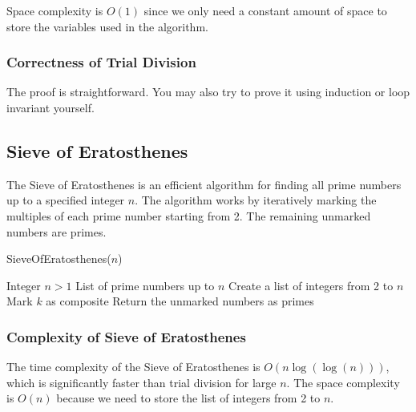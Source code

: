 \documentclass[oneside]{book}
\begin{document}
Space complexity is \(O(1)\) since we only need a constant amount of space to store the variables used in the algorithm.

\subsubsection{Correctness of Trial Division}
The proof is straightforward. You may also try to prove it using induction or loop invariant yourself.


\subsection{Sieve of Eratosthenes}
The Sieve of Eratosthenes is an efficient algorithm for finding all prime numbers up to a specified integer \( n \). The algorithm works by iteratively marking the multiples of each prime number starting from 2. The remaining unmarked numbers are primes.
\begin{algorithm}[H]
	\caption{SieveOfEratosthenes($n$)}
	\begin{algorithmic}[1]
		\Require Integer \(n > 1\)
		\Ensure List of prime numbers up to \(n\)
		\State Create a list of integers from 2 to \(n\)
		\State Mark \(k\) as composite
		\EndFor
		\EndIf
		\EndFor
		\State Return the unmarked numbers as primes
	\end{algorithmic}
\end{algorithm}


\subsubsection{Complexity of Sieve of Eratosthenes}
The time complexity of the Sieve of Eratosthenes is \(O(n \log(\log(n)))\), which is significantly faster than trial division for large \(n\). The space complexity is \(O(n)\) because we need to store the list of integers from 2 to \(n\).
\end{document}
